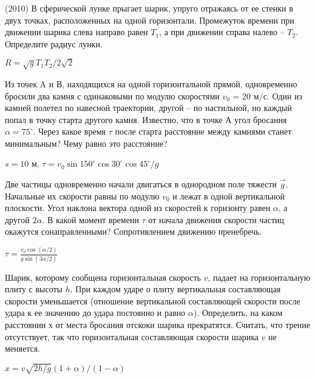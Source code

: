 \begin{ex}
(2010) В сферической лунке прыгает шарик, упруго отражаясь от ее стенки в двух точках, расположенных на одной горизонтали. Промежуток времени при движении шарика слева направо равен $T_{1}$, а при движении справа налево -- $T_2$. Определите радиус лунки.
\begin{ans}
$R = \sqrt{g} T_1 T_2 /2\sqrt{2}$
\end{ans}
\end{ex}

\begin{ex}
Из точек A и В, находящихся на одной горизонтальной прямой, одновременно бросили два камня с одинаковыми по модулю скоростями $v_0$ = 20 м/с. 
Один из камней полетел по навесной траектории, другой -- по настильной, но каждый попал в точку старта другого камня. 
Известно, что в точке А угол бросания $\alpha = 75^{\circ}$. 
Через какое время $\tau$ после старта расстояние между камнями станет минимальным? Чему равно это расстояние?
\begin{ans}
$s = 10$ м, $\tau = v_0 \sin 150^{\circ} \cos 30^{\circ} \cos 45^{\circ} /g$
\end{ans}
\end{ex}

\begin{ex}
Две частицы одновременно начали двигаться в однородном поле тяжести $\vec g$. Начальные их скорости равны по модулю $v_0$ и лежат в одной вертикальной плоскости. Угол наклона вектора одной из скоростей к горизонту равен $\alpha$, а другой $2\alpha$. В какой момент времени $\tau$ от начала движения скорости частиц окажутся сонаправленными? Сопротивлением движению пренебречь.
\begin{ans}
$\tau = \frac{v_0 \cos (\alpha /2)}{g \sin (3\alpha / 2)}$
\end{ans}
\end{ex}

\begin{ex}
Шарик, которому сообщена горизонтальная скорость $v$, падает на горизонтальную плиту с высоты $h$. При каждом ударе о плиту вертикальная составляющая скорости уменьшается (отношение вертикальной составляющей скорости после удара к ее значению до удара постоянно и равно $\alpha$). Определить, на каком расстоянии $х$ от места бросания отскоки шарика прекратятся. Считать, что трение отсутствует, так что горизонтальная составляющая скорости шарика $v$ не меняется.
\begin{ans}
$x = v \sqrt{2h/g} \left( 1 + \alpha \right) / \left( 1 - \alpha \right)$
\end{ans}
\end{ex}